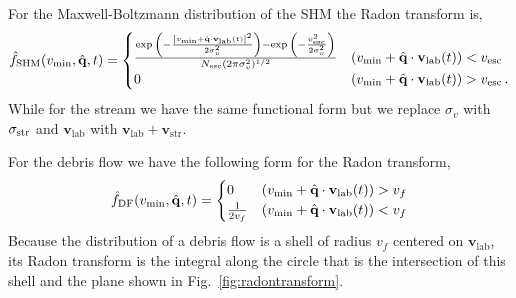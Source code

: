 For the Maxwell-Boltzmann distribution of the SHM the Radon transform is,
\begin{equation}
\hat{f}_{\rm SHM}(v_{\text{min}},\hat{\bf{q}}, t) =
\begin{cases}
\frac{\exp{\left(-\frac{\left|v_{\text{min}} + \hat{\bf{q}}\cdot{\bf v}_{\rm lab}(t)\right|^2}{2\sigma^2_v}\right)} - \exp{\left(-\frac{v_{\rm esc}^2}{2\sigma^2_v}\right)}}{N_{\rm esc}(2\pi\sigma_v^{2})^{1/2}} & (v_\mathrm{min} + \hat{\textbf{q}} \cdot  \textbf{v}_\textrm{lab}(t))< v_{\rm esc} \\
0 & (v_\mathrm{min} + \hat{\textbf{q}} \cdot  \textbf{v}_\textrm{lab}(t))> v_{\rm esc} \, .
\end{cases}
\end{equation} 
While for the stream we have the same functional form but we replace $\sigma_v$ with $\sigma_{\rm str}$ and $\textbf{v}_\textrm{lab}$ with $\textbf{v}_\textrm{lab}+\textbf{v}_\textrm{str}$. 

For the debris flow we have the following form for the Radon transform,
\begin{equation}
\hat{f}_{\rm DF}(v_{\text{min}},\hat{\bf{q}}, t)  = 
\begin{cases}
0 & (v_\mathrm{min} + \hat{\textbf{q}} \cdot  \textbf{v}_\textrm{lab}(t))> v_f \\
\frac{1}{2v_f} & (v_\mathrm{min} + \hat{\textbf{q}} \cdot  \textbf{v}_\textrm{lab}(t))< v_f 
\end{cases}
\end{equation}
Because the distribution of a debris flow is a shell of radius $v_f$ centered on $\textbf{v}_\textrm{lab}$, its Radon transform is the integral along the circle that is the intersection of this shell and the plane shown in Fig.~\ref{fig:radontransform}.


